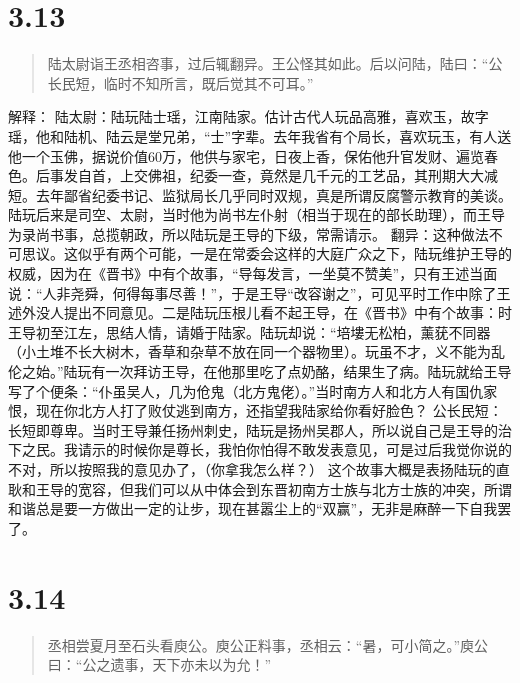 \documentclass[]{book}
\begin{document}
\section{3.13}\label{section-167}

\begin{quote}
陆太尉诣王丞相咨事，过后辄翻异。王公怪其如此。后以问陆，陆曰：``公长民短，临时不知所言，既后觉其不可耳。''
\end{quote}

解释：
陆太尉：陆玩陆士瑶，江南陆家。估计古代人玩品高雅，喜欢玉，故字瑶，他和陆机、陆云是堂兄弟，``士''字辈。去年我省有个局长，喜欢玩玉，有人送他一个玉佛，据说价值60万，他供与家宅，日夜上香，保佑他升官发财、遍览春色。后事发自首，上交佛祖，纪委一查，竟然是几千元的工艺品，其刑期大大减短。去年鄙省纪委书记、监狱局长几乎同时双规，真是所谓反腐警示教育的美谈。陆玩后来是司空、太尉，当时他为尚书左仆射（相当于现在的部长助理），而王导为录尚书事，总揽朝政，所以陆玩是王导的下级，常需请示。
翻异：这种做法不可思议。这似乎有两个可能，一是在常委会这样的大庭广众之下，陆玩维护王导的权威，因为在《晋书》中有个故事，``导每发言，一坐莫不赞美''，只有王述当面说：``人非尧舜，何得每事尽善！''，于是王导``改容谢之''，可见平时工作中除了王述外没人提出不同意见。二是陆玩压根儿看不起王导，在《晋书》中有个故事：时王导初至江左，思结人情，请婚于陆家。陆玩却说：``培塿无松柏，薰莸不同器（小土堆不长大树木，香草和杂草不放在同一个器物里）。玩虽不才，义不能为乱伦之始。''陆玩有一次拜访王导，在他那里吃了点奶酪，结果生了病。陆玩就给王导写了个便条：``仆虽吴人，几为伧鬼（北方鬼佬）。''当时南方人和北方人有国仇家恨，现在你北方人打了败仗逃到南方，还指望我陆家给你看好脸色？
公长民短：长短即尊卑。当时王导兼任扬州刺史，陆玩是扬州吴郡人，所以说自己是王导的治下之民。我请示的时候你是尊长，我怕你怕得不敢发表意见，可是过后我觉你说的不对，所以按照我的意见办了，（你拿我怎么样？）
这个故事大概是表扬陆玩的直耿和王导的宽容，但我们可以从中体会到东晋初南方士族与北方士族的冲突，所谓和谐总是要一方做出一定的让步，现在甚嚣尘上的``双赢''，无非是麻醉一下自我罢了。

\section{3.14}\label{section-168}

\begin{quote}
丞相尝夏月至石头看庾公。庾公正料事，丞相云：``暑，可小简之。''庾公曰：``公之遗事，天下亦未以为允！''
\end{quote}
\end{document}

